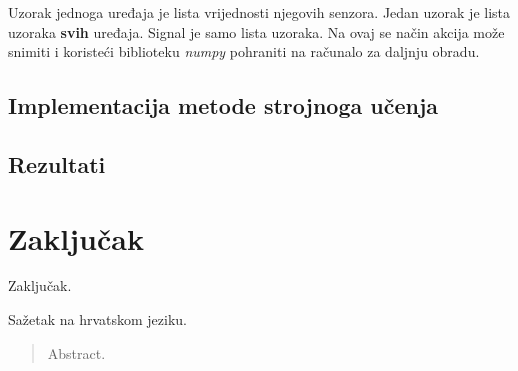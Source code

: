 \documentclass[times, utf8, diplomski]{fer}
\begin{document}
Uzorak jednoga uređaja je lista vrijednosti njegovih senzora. Jedan uzorak je lista uzoraka \textbf{svih} uređaja. Signal je samo lista uzoraka. Na ovaj se način akcija 
može snimiti i koristeći biblioteku \textit{numpy} pohraniti na računalo za daljnju obradu.


\section{Implementacija metode strojnoga učenja}

\section{Rezultati}

\chapter{Zaključak}
Zaključak.




\begin{sazetak}
Sažetak na hrvatskom jeziku.

\end{sazetak}

\begin{abstract}
Abstract.

\end{abstract}
\end{document}
